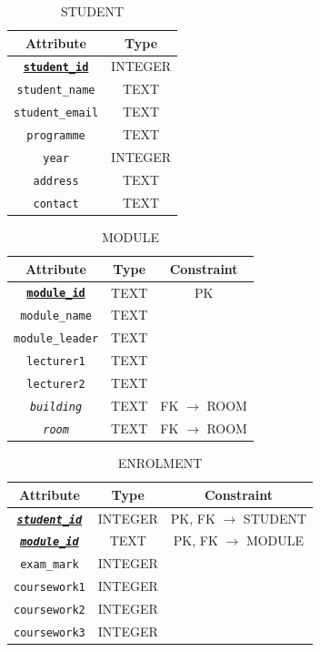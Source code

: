\documentclass[12pt, a4paper]{report}
\begin{document}
\begin{table}[H]
\centering
\begin{tabular}{c|c}
\textbf{Attribute} & \textbf{Type} \\\hline
\textbf{\underline{\texttt{student\_id}}} & INTEGER \\
\texttt{student\_name} & TEXT \\
\texttt{student\_email} & TEXT \\
\texttt{programme} & TEXT \\
\texttt{year} & INTEGER \\
\texttt{address} & TEXT \\
\texttt{contact} & TEXT \\
\end{tabular}
\caption{STUDENT}
\label{tab:student}
\end{table}

\begin{table}[H]
\centering
\begin{tabular}{c|c|c}
\textbf{Attribute} & \textbf{Type} & \textbf{Constraint} \\\hline
\textbf{\underline{\texttt{module\_id}}} & TEXT & PK \\
\texttt{module\_name} & TEXT & \\
\texttt{module\_leader} & TEXT & \\
\texttt{lecturer1} & TEXT & \\
\texttt{lecturer2} & TEXT & \\
\textit{\texttt{building}} & TEXT & FK $\rightarrow$ ROOM \\
\textit{\texttt{room}} & TEXT & FK $\rightarrow$ ROOM \\
\end{tabular}
\caption{MODULE}
\label{tab:module}
\end{table}

\begin{table}[H]
\centering
\begin{tabular}{c|c|c}
\textbf{Attribute} & \textbf{Type} & \textbf{Constraint} \\\hline
\textbf{\underline{\textit{\texttt{student\_id}}}} & INTEGER & PK, FK $\rightarrow$ STUDENT \\
\textbf{\underline{\textit{\texttt{module\_id}}}} & TEXT & PK, FK $\rightarrow$ MODULE \\
\texttt{exam\_mark} & INTEGER & \\
\texttt{coursework1} & INTEGER & \\
\texttt{coursework2} & INTEGER & \\
\texttt{coursework3} & INTEGER & \\
\end{tabular}
\caption{ENROLMENT}
\label{tab:enrolment}
\end{table}
\end{document}
